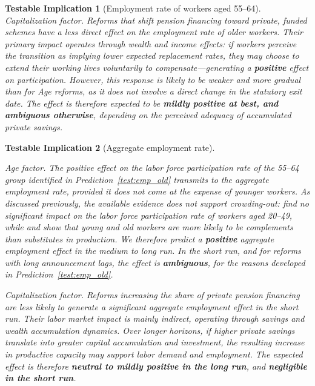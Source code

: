 \documentclass[11pt,english,a4paper, twoside, authoryear]{article}
\newtheorem{testable}{Testable Implication}}
\begin{document}
\begin{testable}[Employment rate of workers aged 55--64]
\textit{Capitalization factor.} Reforms that shift pension financing toward private, funded schemes have a less direct effect on the employment rate of older workers. Their primary impact operates through wealth and income effects: if workers perceive the transition as implying lower expected replacement rates, they may choose to extend their working lives voluntarily to compensate---generating a \textbf{positive} effect on participation. However, this response is likely to be weaker and more gradual than for Age reforms, as it does not involve a direct change in the statutory exit date. The effect is therefore expected to be \textbf{mildly positive at best, and ambiguous otherwise}, depending on the perceived adequacy of accumulated private savings.
\end{testable}

\begin{testable}[Aggregate employment rate]\label{test:emp_agg}

\textit{Age factor.} The positive effect on the labor force participation rate of the 55--64 group identified in Prediction~\ref{test:emp_old} transmits to the aggregate employment rate, provided it does not come at the expense of younger workers. As discussed previously, the available evidence does not support crowding-out: \citet{BiZubairy2023} find no significant impact on the labor force participation rate of workers aged 20--49, while \citet{MunnellWu2012} and \citet{Dai2022} show that young and old workers are more likely to be complements than substitutes in production. We therefore predict a \textbf{positive} aggregate employment effect in the medium to long run. In the short run, and for reforms with long announcement lags, the effect is \textbf{ambiguous}, for the reasons developed in Prediction~\ref{test:emp_old}.

\textit{Capitalization factor.} Reforms increasing the share of private pension financing are less likely to generate a significant aggregate employment effect in the short run. Their labor market impact is mainly indirect, operating through savings and wealth accumulation dynamics. Over longer horizons, if higher private savings translate into greater capital accumulation and investment, the resulting increase in productive capacity may support labor demand and employment. The expected effect is therefore \textbf{neutral to mildly positive in the long run}, and \textbf{negligible in the short run}.
\end{testable}
\end{document}
